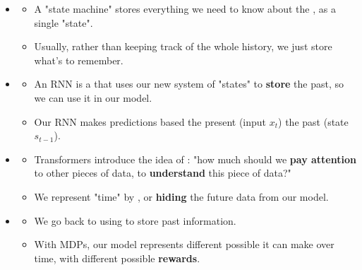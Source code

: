         \begin{itemize}
            \item {}
                \begin{itemize}
                    \item A "state machine" stores everything we need to know about the , as a single "state".
                    
                    \item Usually, rather than keeping track of the whole history, we just store what's  to remember.
                \end{itemize}

            \item {}

                \begin{itemize}
                    \item An RNN is a  that uses our new system of "states" to \textbf{store} the past, so we can use it in our model.
                    
                    \item Our RNN makes predictions based the present (input $x_t$)  the past (state $s_{t-1}$).
                \end{itemize}

            \item {}
                \begin{itemize}
                    \item Transformers introduce the idea of : "how much should we \textbf{pay attention} to other pieces of data, to \textbf{understand} this piece of data?"
                    
                    \item We represent "time" by , or \textbf{hiding} the future data from our model.
                \end{itemize}
            
            \item {}
                \begin{itemize}
                    \item We go back to using  to store past information.
                    \item With MDPs, our model represents different possible  it can make over time, with different possible \textbf{rewards}.
                \end{itemize}


\end{itemize}
